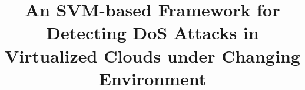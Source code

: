 \documentclass[twocolumn]{bmcart}%
\begin{document}
\begin{frontmatter}

\begin{fmbox}


\title{An SVM-based Framework for Detecting DoS Attacks in Virtualized Clouds under Changing Environment}


\author[
   addressref={aff1},                   %
   email={adel.abusitta@polymtl.ca}     %
]{ }
\author[
   addressref={aff2},
   corref={aff2},
   email={martine.bellaiche@polymtl.ca}
]{ }
\author[
   addressref={aff3},
   email={michel.dagenais@polymtl.ca}
]{ }




\end{fmbox}
\end{frontmatter}
\end{document}
